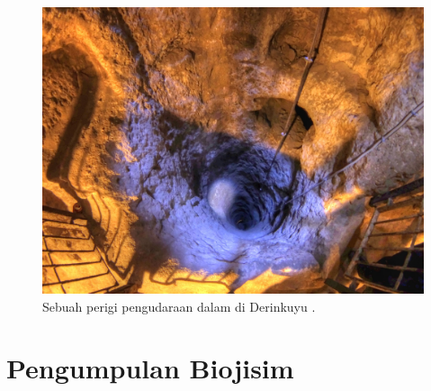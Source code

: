\documentclass[10pt,twocolumn,letterpaper]{article}
\begin{document}
\begin{figure}[t]
\begin{center}
   \includegraphics[width=1\linewidth]{derinkuyu-air.jpg}
\end{center}
   \caption{Sebuah perigi pengudaraan dalam di Derinkuyu \cite{53}.}
\label{fig:6}

\label{fig:onecol}
\end{figure}



\section{Pengumpulan Biojisim}
\end{document}

